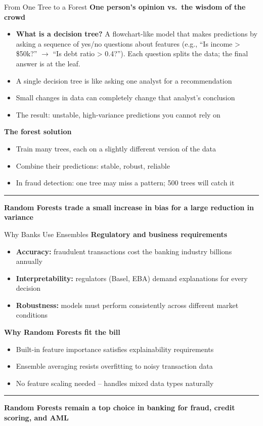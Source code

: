 \documentclass[8pt,aspectratio=169]{beamer}
\newcommand{\bottomnote}[1]{%
\vfill
\vspace{-2mm}
\textcolor{mllavender2}{\rule{\textwidth}{0.4pt}}
\vspace{1mm}
\footnotesize
\textbf{#1}
}
\newcommand{\highlight}[1]{\textcolor{mlorange}{\textbf{#1}}}
\begin{document}
\begin{frame}[t]{From One Tree to a Forest}
\textbf{One person's opinion vs.\ the wisdom of the crowd}
\begin{itemize}
  \item \highlight{What is a decision tree?} A flowchart-like model that makes predictions by asking a sequence of yes/no questions about features (e.g., ``Is income > \$50k?'' $\to$ ``Is debt ratio > 0.4?''). Each question splits the data; the final answer is at the leaf.
  \item A single decision tree is like asking one analyst for a recommendation
  \item Small changes in data can completely change that analyst's conclusion
  \item The result: unstable, high-variance predictions you cannot rely on
\end{itemize}
\vspace{0.8em}
\textbf{The forest solution}
\begin{itemize}
  \item Train many trees, each on a slightly different version of the data
  \item Combine their predictions: stable, robust, reliable
  \item In fraud detection: one tree may miss a pattern; 500 trees will catch it
\end{itemize}
\bottomnote{Random Forests trade a small increase in bias for a large reduction in variance}
\end{frame}

\begin{frame}[t]{Why Banks Use Ensembles}
\textbf{Regulatory and business requirements}
\begin{itemize}
  \item \highlight{Accuracy:} fraudulent transactions cost the banking industry billions annually
  \item \highlight{Interpretability:} regulators (Basel, EBA) demand explanations for every decision
  \item \highlight{Robustness:} models must perform consistently across different market conditions
\end{itemize}
\vspace{0.8em}
\textbf{Why Random Forests fit the bill}
\begin{itemize}
  \item Built-in feature importance satisfies explainability requirements
  \item Ensemble averaging resists overfitting to noisy transaction data
  \item No feature scaling needed -- handles mixed data types naturally
\end{itemize}
\bottomnote{Random Forests remain a top choice in banking for fraud, credit scoring, and AML}
\end{frame}
\end{document}
